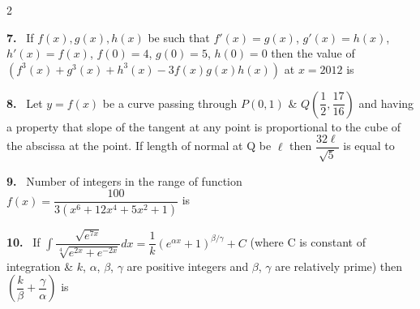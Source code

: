 \documentclass[10pt]{extarticle}
\newcommand{\qn}[1]{\par\smallskip\noindent\textbf{#1.}~}
\begin{document}
\begin{multicols}{2}
\qn{7} If $f(x),g(x),h(x)$ be such that $f'(x)=g(x)$, $g'(x)=h(x)$, $h'(x)=f(x)$, $f(0)=4$, $g(0)=5$, $h(0)=0$ then the value of $\left(f^3(x)+g^3(x)+h^3(x)-3f(x)g(x)h(x)\right)$ at $x=2012$ is
\qn{8} Let $y=f(x)$ be a curve passing through $P(0,1)$ \& $Q\left(\dfrac12,\dfrac{17}{16}\right)$ and having a property that slope of the tangent at any point is proportional to the cube of the abscissa at the point. If length of normal at Q be $\ell$ then $\dfrac{32\ell}{\sqrt5}$ is equal to
\qn{9} Number of integers in the range of function $f(x)=\dfrac{100}{3\left(x^6+12x^4+5x^2+1\right)}$ is
\qn{10} If $\displaystyle\int\dfrac{\sqrt{e^{7x}}}{\sqrt[4]{e^{2x}+e^{-2x}}}dx=\dfrac1k\left(e^{\alpha x}+1\right)^{\beta/\gamma}+C$ (where C is constant of integration \& $k$, $\alpha$, $\beta$, $\gamma$ are positive integers and $\beta$, $\gamma$ are relatively prime) then $\left(\dfrac k\beta+\dfrac\gamma\alpha\right)$ is
\end{multicols}
\end{document}
